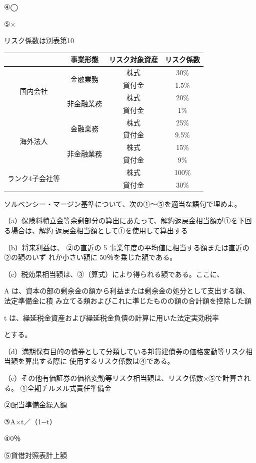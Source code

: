 \documentclass[report,gutter=10mm,fore-edge=10mm,uplatex,dvipdfmx]{jlreq}
\begin{document}
④◯

⑤×

リスク係数は別表第10

\begin{tabular}{|c|c|c|c|}
\hline
&事業形態 &リスク対象資産 &リスク係数\\
\hline
 \multirow{4}{*}{国内会社}&\multirow{2}{*}{金融業務} &株式 & 30\%\\
& &貸付金 & 1.5\%\\
\cline{2-4}
&\multirow{2}{*}{非金融業務} &株式 & 20\%\\
& &貸付金 & 1\%\\
\hline
 \multirow{4}{*}{海外法人}&\multirow{2}{*}{金融業務} &株式 & 25\%\\
& &貸付金 & 9.5\%\\
\cline{2-4}
&\multirow{2}{*}{非金融業務} &株式 & 15\%\\
& &貸付金 & 9\%\\
\hline
 \multirow{2}{*}{ランク4子会社等}& &株式 & 100\%\\
&&貸付金& 30\%\\
\hline
\end{tabular}

ソルベンシー・マージン基準について、次の①～⑤を適当な語句で埋めよ。

（a）保険料積立金等余剰部分の算出にあたって、解約返戻金相当額が①を下回る場合は、解約
返戻金相当額として①を使用して算出する

（b）将来利益は、 ②の直近の 5 事業年度の平均値に相当する額または直近の②の額のいず
れか小さい額に 50％を乗じた額である。

（c）税効果相当額は、③（算式）により得られる額である。ここに、

A は、資本の部の剰余金の額から利益または剰余金の処分として支出する額、法定準備金に積
み立てる類およびこれに準じたものの額の合計額を控除した額

t は、繰延税金資産および繰延税金負債の計算に用いた法定実効税率

とする。

（d）満期保有目的の債券として分類している邦貨建債券の価格変動等リスク相当額を算出する際に
使用するリスク係数は④である。

（e）その他有価証券の価格変動等リスク相当額は、リスク係数×⑤で計算される。
\answer{}
①全期チルメル式責任準備金

②配当準備金繰入額

③A×t／（1−t）

④0％

⑤貸借対照表計上額
\end{document}
